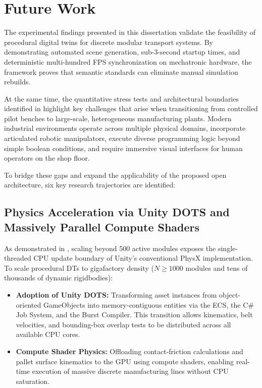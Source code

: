 \section{Future Work}
\label{sec:future_work}

The experimental findings presented in this dissertation validate the feasibility of procedural digital twins for discrete modular transport systems. By demonstrating automated scene generation, sub-3-second startup times, and deterministic multi-hundred \gls{FPS} synchronization on mechatronic hardware, the framework proves that semantic standards can eliminate manual simulation rebuilds. 

At the same time, the quantitative stress tests and architectural boundaries identified in  highlight key challenges that arise when transitioning from controlled pilot benches to large-scale, heterogeneous manufacturing plants. Modern industrial environments operate across multiple physical domains, incorporate articulated robotic manipulators, execute diverse programming logic beyond simple boolean conditions, and require immersive visual interfaces for human operators on the shop floor. 

To bridge these gaps and expand the applicability of the proposed open architecture, six key research trajectories are identified:

\subsection{Physics Acceleration via Unity \texorpdfstring{\gls{DOTS}}{DOTS} and Massively Parallel Compute Shaders}
As demonstrated in , scaling beyond 500 active modules exposes the single-threaded \gls{CPU} update boundary of Unity's conventional PhysX implementation. To scale procedural \glspl{DT} to gigafactory density ($N \ge 1000$ modules and tens of thousands of dynamic rigidbodies):
\begin{itemize}
    \item \textbf{Adoption of Unity \gls{DOTS}:} Transforming asset instances from object-oriented GameObjects into memory-contiguous entities via the \gls{ECS}, the C\# Job System, and the Burst Compiler. This transition allows kinematics, belt velocities, and bounding-box overlap tests to be distributed across all available \gls{CPU} cores.
    \item \textbf{Compute Shader Physics:} Offloading contact-friction calculations and pallet surface kinematics to the \gls{GPU} using compute shaders, enabling real-time execution of massive discrete manufacturing lines without \gls{CPU} saturation.
\end{itemize}

